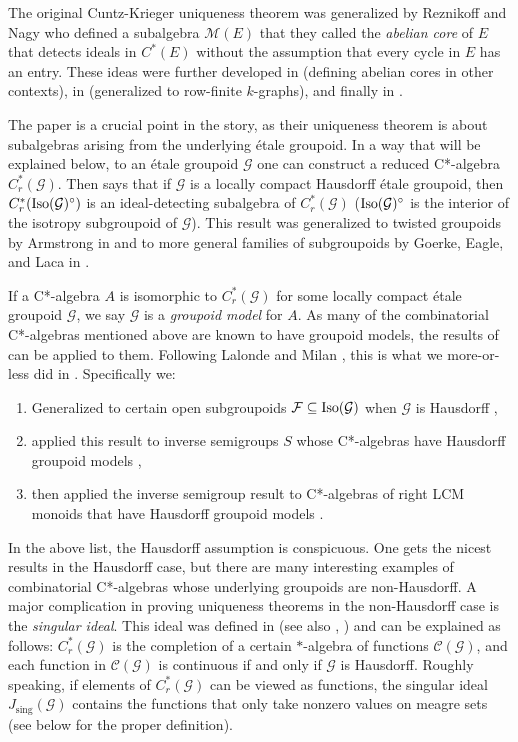 \documentclass[12pt]{amsart}
\theoremstyle{definition}
\theoremstyle{remark}
\numberwithin{equation}{section}
\newcommand{\mc}{\mathcal}
\newcommand{\Iso}{\textup{Iso}}
\newcommand{\g}{\mathcal{G}}
\newcommand{\Js}{J_{\text{sing}}}
\begin{document}
The original Cuntz-Krieger uniqueness theorem was generalized by Reznikoff and Nagy \cite{NR12} who defined a subalgebra $\mc{M}(E)$ that they called the {\em abelian core} of $E$ that detects ideals in $C^*(E)$ without the assumption that every cycle in $E$ has an entry. These ideas were further developed in \cite{NR14} (defining abelian cores in other contexts), in \cite{BNR14} (generalized to row-finite $k$-graphs), and finally in \cite{BNRSW16}. 

The paper \cite{BNRSW16} is a crucial point in the story, as their uniqueness theorem is about subalgebras arising from the underlying \'etale groupoid. In a way that will be explained below, to an \'etale groupoid $\g$ one can construct a reduced C*-algebra $C^*_r(\g)$. Then \cite[Theorem~3.1]{BNRSW16} says that if $\g$ is a locally compact Hausdorff \'etale groupoid, then $C^*_r(\Iso(\g)^\circ)$ is an ideal-detecting subalgebra of $C^*_r(\g)$ ($\Iso(\g)^\circ$ is the interior of the isotropy subgroupoid of $\g$). This result was generalized to twisted groupoids by Armstrong in \cite{Arm22} and to more general families of subgroupoids by Goerke, Eagle, and Laca in \cite{GEL24}.

If a C*-algebra $A$ is isomorphic to $C^*_r(\g)$ for some locally compact \'etale groupoid $\g$, we say $\g$ is a {\em groupoid model} for $A$. As many of the combinatorial C*-algebras mentioned above are known to have groupoid models, the results of \cite{BNRSW16} can be applied to them. Following Lalonde and Milan \cite{LM17}, this is what we more-or-less did in \cite{St22}. Specifically we:
\begin{enumerate}
	\item Generalized \cite[Theorem~3.1]{BNRSW16} to certain open subgroupoids $\mc{F}\subseteq \Iso(\g)$ when $\g$ is Hausdorff \cite[Theorem~2.1]{St22},
	\item applied this result to inverse semigroups $S$ whose C*-algebras have Hausdorff groupoid models \cite[Theorem~3.3]{St22},
	\item then applied the inverse semigroup result to C*-algebras of right LCM monoids that have Hausdorff groupoid models \cite[Theorem~4.1]{St22} \cite[Theorem~2.1]{BS24}.
\end{enumerate}

In the above list, the Hausdorff assumption is conspicuous. One gets the nicest results in the Hausdorff case, but there are many interesting examples of combinatorial C*-algebras whose underlying groupoids are non-Hausdorff. A major complication in proving uniqueness theorems in the non-Hausdorff case is the {\em singular ideal}. This ideal was defined in \cite{CEPSS} (see also \cite{KM21}, \cite{EPBook22}) and can be explained as follows: $C^*_r(\g)$ is the completion of a certain $*$-algebra of functions $\mc{C}(\g)$, and each function in $\mc{C}(\g)$ is continuous if and only if $\g$ is Hausdorff. Roughly speaking, if elements of $C^*_r(\g)$ can be viewed as functions, the singular ideal $\Js(\g)$ contains the functions that only take nonzero values on meagre sets (see below for the proper definition). 
\end{document}

